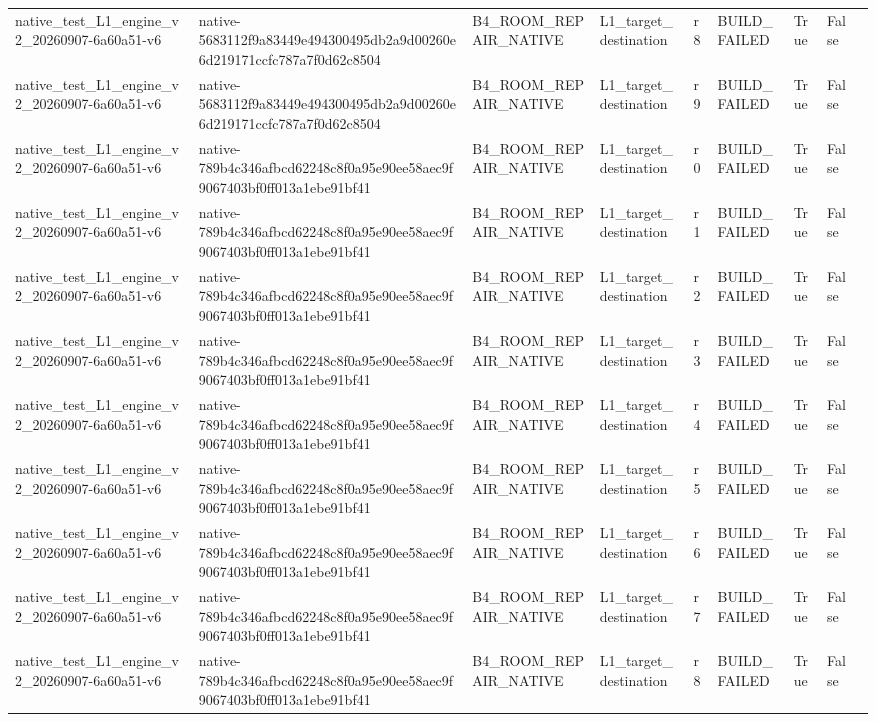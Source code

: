\begin{tabular}{lllllllll}
native\_test\_L1\_engine\_v2\_20260907-6a60a51-v6 & native-5683112f9a83449e494300495db2a9d00260e6d219171ccfc787a7f0d62c8504 & B4\_ROOM\_REPAIR\_NATIVE & L1\_target\_destination & r8 & BUILD\_FAILED & True & False &  \\
native\_test\_L1\_engine\_v2\_20260907-6a60a51-v6 & native-5683112f9a83449e494300495db2a9d00260e6d219171ccfc787a7f0d62c8504 & B4\_ROOM\_REPAIR\_NATIVE & L1\_target\_destination & r9 & BUILD\_FAILED & True & False &  \\
native\_test\_L1\_engine\_v2\_20260907-6a60a51-v6 & native-789b4c346afbcd62248c8f0a95e90ee58aec9f9067403bf0ff013a1ebe91bf41 & B4\_ROOM\_REPAIR\_NATIVE & L1\_target\_destination & r0 & BUILD\_FAILED & True & False &  \\
native\_test\_L1\_engine\_v2\_20260907-6a60a51-v6 & native-789b4c346afbcd62248c8f0a95e90ee58aec9f9067403bf0ff013a1ebe91bf41 & B4\_ROOM\_REPAIR\_NATIVE & L1\_target\_destination & r1 & BUILD\_FAILED & True & False &  \\
native\_test\_L1\_engine\_v2\_20260907-6a60a51-v6 & native-789b4c346afbcd62248c8f0a95e90ee58aec9f9067403bf0ff013a1ebe91bf41 & B4\_ROOM\_REPAIR\_NATIVE & L1\_target\_destination & r2 & BUILD\_FAILED & True & False &  \\
native\_test\_L1\_engine\_v2\_20260907-6a60a51-v6 & native-789b4c346afbcd62248c8f0a95e90ee58aec9f9067403bf0ff013a1ebe91bf41 & B4\_ROOM\_REPAIR\_NATIVE & L1\_target\_destination & r3 & BUILD\_FAILED & True & False &  \\
native\_test\_L1\_engine\_v2\_20260907-6a60a51-v6 & native-789b4c346afbcd62248c8f0a95e90ee58aec9f9067403bf0ff013a1ebe91bf41 & B4\_ROOM\_REPAIR\_NATIVE & L1\_target\_destination & r4 & BUILD\_FAILED & True & False &  \\
native\_test\_L1\_engine\_v2\_20260907-6a60a51-v6 & native-789b4c346afbcd62248c8f0a95e90ee58aec9f9067403bf0ff013a1ebe91bf41 & B4\_ROOM\_REPAIR\_NATIVE & L1\_target\_destination & r5 & BUILD\_FAILED & True & False &  \\
native\_test\_L1\_engine\_v2\_20260907-6a60a51-v6 & native-789b4c346afbcd62248c8f0a95e90ee58aec9f9067403bf0ff013a1ebe91bf41 & B4\_ROOM\_REPAIR\_NATIVE & L1\_target\_destination & r6 & BUILD\_FAILED & True & False &  \\
native\_test\_L1\_engine\_v2\_20260907-6a60a51-v6 & native-789b4c346afbcd62248c8f0a95e90ee58aec9f9067403bf0ff013a1ebe91bf41 & B4\_ROOM\_REPAIR\_NATIVE & L1\_target\_destination & r7 & BUILD\_FAILED & True & False &  \\
native\_test\_L1\_engine\_v2\_20260907-6a60a51-v6 & native-789b4c346afbcd62248c8f0a95e90ee58aec9f9067403bf0ff013a1ebe91bf41 & B4\_ROOM\_REPAIR\_NATIVE & L1\_target\_destination & r8 & BUILD\_FAILED & True & False &  \\

\end{tabular}
